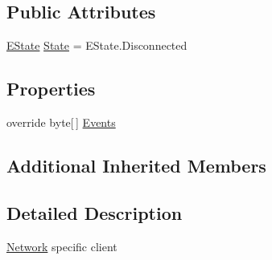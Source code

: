 \subsection*{Public Attributes}
\begin{DoxyCompactItemize}
\item 
\hyperlink{classgearit_1_1src_1_1_network_1_1_network_client_a8c5d63a28969b69f509466b1e2138aee}{E\+State} \hyperlink{classgearit_1_1src_1_1_network_1_1_network_client_a3117b735052b922fb7376bd13f85b740}{State} = E\+State.\+Disconnected
\end{DoxyCompactItemize}
\subsection*{Properties}
\begin{DoxyCompactItemize}
\item 
override byte\mbox{[}$\,$\mbox{]} \hyperlink{classgearit_1_1src_1_1_network_1_1_network_client_a701aff727a060db8b87bba8cf16342ad}{Events}
\end{DoxyCompactItemize}
\subsection*{Additional Inherited Members}


\subsection{Detailed Description}
\hyperlink{namespacegearit_1_1src_1_1_network}{Network} specific client 



